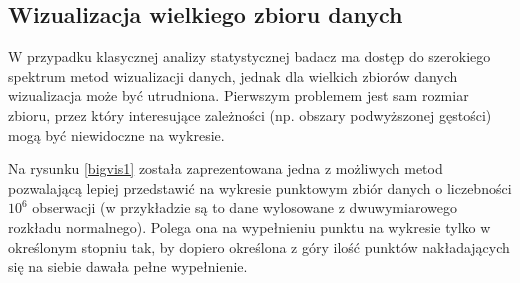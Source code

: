 \documentclass[man,mfu]{mgrwms}
\begin{document}
\subsection{Wizualizacja wielkiego zbioru danych}

W przypadku klasycznej analizy statystycznej badacz ma dostęp do szerokiego spektrum metod wizualizacji danych, jednak dla wielkich zbiorów danych wizualizacja może być utrudniona. Pierwszym problemem jest sam rozmiar zbioru, przez który interesujące zależności (np. obszary podwyższonej gęstości) mogą być niewidoczne na wykresie.

Na rysunku \ref{bigvis1} została zaprezentowana jedna z możliwych metod pozwalającą lepiej przedstawić na wykresie punktowym zbiór danych o liczebności $10^6$ obserwacji (w przykładzie są to dane wylosowane z dwuwymiarowego rozkładu normalnego). Polega ona na wypełnieniu punktu na wykresie tylko w określonym stopniu tak, by dopiero określona z góry ilość punktów nakładających się na siebie dawała pełne wypełnienie.
\end{document}
